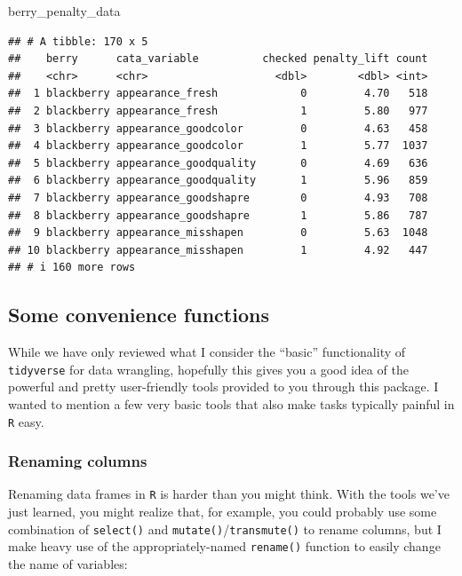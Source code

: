 \documentclass[
]{book}
\newenvironment{Shaded}{\begin{snugshade}}{\end{snugshade}}
\newcommand{\NormalTok}[1]{#1}
\begin{document}
\begin{Shaded}
\begin{Highlighting}[]
\NormalTok{berry\_penalty\_data}
\end{Highlighting}
\end{Shaded}

\begin{verbatim}
## # A tibble: 170 x 5
##    berry      cata_variable          checked penalty_lift count
##    <chr>      <chr>                    <dbl>        <dbl> <int>
##  1 blackberry appearance_fresh             0         4.70   518
##  2 blackberry appearance_fresh             1         5.80   977
##  3 blackberry appearance_goodcolor         0         4.63   458
##  4 blackberry appearance_goodcolor         1         5.77  1037
##  5 blackberry appearance_goodquality       0         4.69   636
##  6 blackberry appearance_goodquality       1         5.96   859
##  7 blackberry appearance_goodshapre        0         4.93   708
##  8 blackberry appearance_goodshapre        1         5.86   787
##  9 blackberry appearance_misshapen         0         5.63  1048
## 10 blackberry appearance_misshapen         1         4.92   447
## # i 160 more rows
\end{verbatim}

\hypertarget{some-convenience-functions}{%
\subsection{Some convenience functions}\label{some-convenience-functions}}

While we have only reviewed what I consider the ``basic'' functionality of \texttt{tidyverse} for data wrangling, hopefully this gives you a good idea of the powerful and pretty user-friendly tools provided to you through this package. I wanted to mention a few very basic tools that also make tasks typically painful in \texttt{R} easy.

\hypertarget{renaming-columns}{%
\subsubsection{Renaming columns}\label{renaming-columns}}

Renaming data frames in \texttt{R} is harder than you might think. With the tools we've just learned, you might realize that, for example, you could probably use some combination of \texttt{select()} and \texttt{mutate()}/\texttt{transmute()} to rename columns, but I make heavy use of the appropriately-named \texttt{rename()} function to easily change the name of variables:
\end{document}
